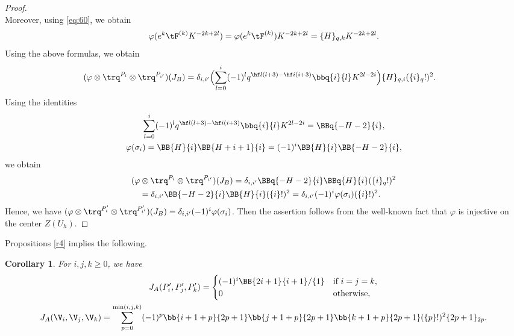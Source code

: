 \documentclass{amsart}
\numberwithin{equation}{section}
\numberwithin{figure}{section}
\theoremstyle{plain}
\newtheorem{corollary}[theorem]{Corollary}
\theoremstyle{definition}
\theoremstyle{remark}
\begin{document}
\begin{proof}
\begin{equation*}
  \end{equation*}
  Moreover, using \eqref{eq:60}, we obtain
  \begin{equation*}
    \varphi(e^k   \tF^{(k)} K^{-2k+2l})
    =\varphi(e^k   \tF^{(k)}) K^{-2k+2l}
    =\{H\}_{q,k}  K^{-2k+2l}.
  \end{equation*}
  Using the above formulas, we obtain
  \begin{equation*}
    \begin{split}
      &(\varphi\otimes \trq^{P_{i}}\otimes \trq^{P_{i'}})(J_B)
      =\delta _{i,i'}
	\Bigl(\sum_{l=0}^{i}
	(-1)^{l}
	q^{\hf l(l+3)-\hf i(i+3)}
	\bbq{i}{l}
	K^{2l-2i}
	\Bigr)
	\{H\}_{q,i}
	 (\{i\}_q!)^2.
    \end{split}
  \end{equation*}
  Using the identities
  \begin{gather*}
      \sum_{l=0}^{i}(-1)^{l}q^{\hf l(l+3)-\hf i(i+3)}
      \bbq{i}{l}K^{2l-2i}
      =\BBq{-H-2}{i},\\
      \varphi(\sigma _i)
      = \BB{H}{i} \BB{H+i+1}{i}
      = (-1)^i\BB{H}{i} \BB{-H-2}{i},
  \end{gather*}
  we obtain
  \begin{equation*}
    \begin{split}
      &(\varphi\otimes \trq^{P_{i}}\otimes \trq^{P_{i'}})(J_B)
      =\delta _{i,i'}
	\BBq{-H-2}{i}\BBq{H}{i}
	 (\{i\}_q!)^2\\
	&\quad =\delta _{i,i'} \BB{-H-2}{i}\BB{H}{i}
	 (\{i\}!)^2
	=\delta _{i,i'}(-1)^i\varphi(\sigma _i) (\{i\}!)^2.
    \end{split}
  \end{equation*}
  Hence, we have
  $(\varphi\otimes \trq^{P'_{i}}\otimes \trq^{P'_{i'}})(J_B)=\delta _{i,i'}(-1)^i\varphi(\sigma _i)$.
  Then the assertion follows from the well-known fact that $\varphi$
  is injective on the center $Z(U_h)$.
\end{proof}

Propositions \ref{r4} implies the following.

\begin{corollary}
  \label{r2}
  For $i,j,k\ge 0$, we have
  \begin{gather}
    \label{e3}
    J_{A}(P'_i, P'_j, P'_k)
    =\begin{cases}
    (-1)^i{\BB{2i+1}{i+1}}/{\{1\}} & \text{if $i=j=k$},\\
    0 & \text{otherwise},
    \end{cases}\\
    \label{e10}
    J_{A}(\V_i, \V_j, \V_k)
    =\sum_{p=0}^{\min(i,j,k)}(-1)^p
    \bb{i+1+p}{2p+1} \bb{j+1+p}{2p+1}\bb{k+1+p}{2p+1}
    (\{p\}!)^2\{2p+1\}_{2p}.
  \end{gather}
\end{corollary}
\end{document}
